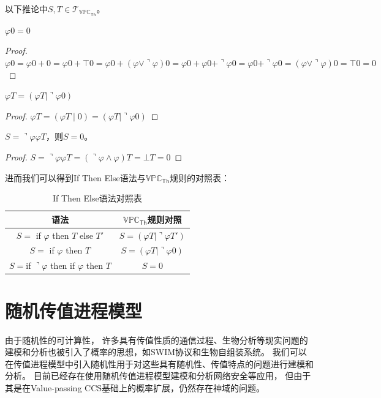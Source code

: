 以下推论中$S,T\in \mathcal{T}_{\mathbb{VPC}_\mathsf{Th}}$。
\begin{corollary} 
   $\varphi 0 = 0$
\end{corollary}
\begin{proof}
   $\varphi 0 = \varphi 0 + 0 = \varphi 0 + \top 0 = \varphi 0 + (\varphi \vee \urcorner \varphi)0 = \varphi 0 + \varphi 0 + \urcorner \varphi 0 = \varphi 0 + \urcorner \varphi 0 = (\varphi \vee \urcorner \varphi)0 = \top 0 = 0$
\end{proof}
\begin{corollary}
   $\varphi T = (\varphi T\mid \urcorner \varphi 0)$
\end{corollary}
\begin{proof}
   $\varphi T = (\varphi T\mid 0) = (\varphi T\mid \urcorner \varphi 0)$
\end{proof}
\begin{corollary}
   $S=\urcorner\varphi \varphi T$，则$S=0$。
\end{corollary}
\begin{proof}
   $S=\urcorner\varphi \varphi T = (\urcorner\varphi\wedge\varphi)T=\bot T=0$
\end{proof}
进而我们可以得到If Then Else语法与$\mathbb{VPC}_\mathsf{Th}$规则的对照表：
\begin{table}[!hpt]
   \caption[If Then Else语法对照表]{If Then Else语法对照表\footnotemark}
   \label{tab:ifthenelse}
   \centering
   \begin{tabular}{@{}cc@{}} \toprule
     语法 & $\mathbb{VPC}_{\mathsf{Th}}$规则对照 \\ \midrule
     $S=$ if $\varphi$ then $T$ else $T'$& $S=(\varphi T|\urcorner \varphi T')$\\
     $S=$ if $\varphi$ then $T$ & $S=(\varphi T|\urcorner\varphi 0)$\\
     $S = $if $\urcorner \varphi$ then if $\varphi$ then $T$ & $S=0$\\ \bottomrule
   \end{tabular}
 \end{table}

\section{随机传值进程模型}
由于随机性的可计算性，
许多具有传值性质的通信过程、生物分析等现实问题的建模和分析也被引入了概率的思想，如SWIM协议\cite{SWIM}和生物自组装系统\cite{BioProcess}。
我们可以在传值进程模型中引入随机性用于对这些具有随机性、传值特点的问题进行建模和分析。
目前已经存在使用随机传值进程模型建模和分析网络安全\cite{NetworkSecurity}等应用，
但由于其是在Value-passing CCS\cite{Milner_CCS}基础上的概率扩展，\cite{NetworkSecurity,Prob_VPCCS}仍然存在神域的问题。

